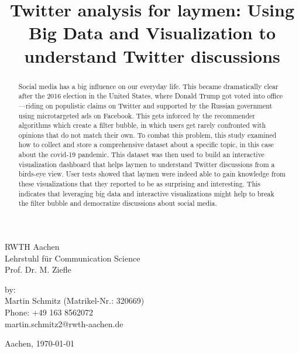 \documentclass[12pt]{article}
\title{Twitter analysis for laymen: Using Big Data and Visualization to understand Twitter discussions}\let\Title\@title     %
\begin{document}


\begin{titlepage}
    
    \large
    RWTH Aachen\\
    Lehrstuhl für Communication Science\\
    Prof. Dr. M. Ziefle
    
    \vspace{5cm}
    \Large
    \doublespacing{
        \textit{Master thesis\\}
        \textbf{\Title}
    }
    
    \vspace{7cm}
    \normalsize
    by:\\
    Martin Schmitz (Matrikel-Nr.: 320669)\\
    Phone: +49 163 8562072\\
    martin.schmitz2@rwth-aachen.de
    
    \vfill
    
    Aachen, \today    
\afterpage{\cfoot{\textcolor{hgray}{\thepage}}}
        
\end{titlepage}


\begin{abstract}
    Social media has a big influence on our everyday life. This became dramatically clear after the 2016 election in the United States, where Donald Trump got voted into office---riding on populistic claims on Twitter and supported by the Russian government using microtargeted ads on Facebook. This gets inforced by the recommender algorithms which create a filter bubble, in which users get rarely confronted with opinions that do not match their own.
    To combat this problem, this study examined how to collect and store a comprehensive dataset about a specific topic, in this case about the covid-19 pandemic. This dataset was then used to build an interactive visualization dashboard that helps laymen to understand Twitter discussions from a birds-eye view. User tests showed that laymen were indeed able to gain knowledge from these visualizations that they reported to be as surprising and interesting. This indicates that leveraging big data and interactive visualizations might help to break the filter bubble and democratize discussions about social media. 
\end{abstract}
\end{document}
